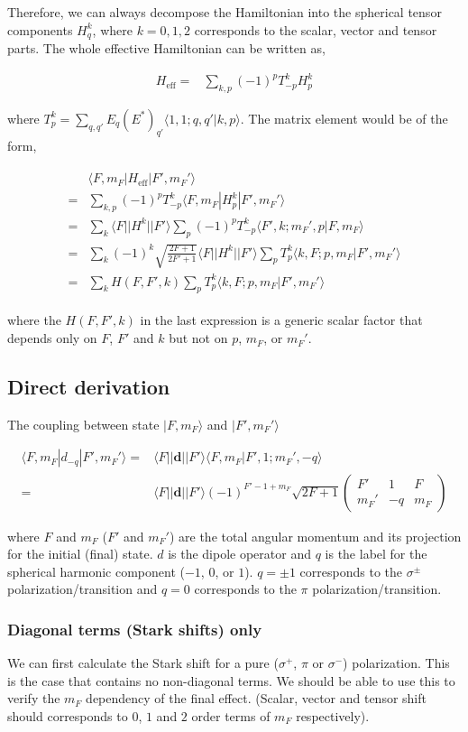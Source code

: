 \documentclass[10pt,fleqn]{article}
\newcommand{\dsum}{\displaystyle\sum}
\newcommand{\eqar}[1]
{
  \begin{align}
    #1
  \end{align}
}
\begin{document}
Therefore, we can always decompose the Hamiltonian into the spherical tensor components
$H^k_q$, where $k=0,1,2$ corresponds to the scalar, vector and tensor parts.
The whole effective Hamiltonian can be written as,
\eqar{
  H_{\mathrm{eff}}=&\sum_{k,p}(-1)^p T^k_{-p}H^k_p
}
where $T^k_p=\dsum_{q,q'}E_q(E^*)_{q'}\langle 1,1;q,q'|k,p\rangle$.
The matrix element would be of the form,
\eqar{
  \begin{split}
    &\langle F,m_F|H_{\mathrm{eff}}|F',m_F'\rangle\\
    =&\sum_{k,p}(-1)^p T^k_{-p}\langle F,m_F|H^k_p|F',m_F'\rangle\\
    =&\sum_{k}\langle F||H^k||F'\rangle\sum_{p}(-1)^p T^k_{-p}
       \langle F',k;m_F',p|F,m_F\rangle\\
    =&\sum_{k}(-1)^{k}\sqrt{\frac{2F+1}{2F'+1}}\langle F||H^k||F'\rangle
       \sum_{p}T^k_{p}\langle k,F;p,m_F|F',m_F'\rangle\\
    =&\sum_{k}H(F,F',k)\sum_{p}T^k_{p}\langle k,F;p,m_F|F',m_F'\rangle
  \end{split}
}
where the $H(F,F',k)$ in the last expression is a generic scalar factor
that depends only on $F$, $F'$ and $k$ but not on $p$, $m_F$, or $m_F'$.


\subsection{Direct derivation}
The coupling between state $|F,m_F\rangle$ and $|F',m_F'\rangle$
\eqar{
  \langle F,m_F|d_{-q}|F',m_F'\rangle=&\langle F||\mathbf{d}||F'\rangle\langle F,m_F|F',1;m_F',-q\rangle\\
  =&\langle F||\mathbf{d}||F'\rangle (-1)^{F'-1+m_F}\sqrt{2F+1}
  \begin{pmatrix}
    F'&1&F\\
    m_F'&-q&m_F
  \end{pmatrix}
}
where $F$ and $m_F$ ($F'$ and $m_F'$) are the total angular momentum and its projection
for the initial (final) state. $d$ is the dipole operator and $q$ is the label
for the spherical harmonic component ($-1$, $0$, or $1$).
$q=\pm1$ corresponds to the $\sigma^\pm$ polarization/transition
and $q=0$ corresponds to the $\pi$ polarization/transition.\\

\subsubsection{Diagonal terms (Stark shifts) only}\label{stark-shift-explicit}
We can first calculate the Stark shift for a pure
($\sigma^+$, $\pi$ or $\sigma^-$) polarization.
This is the case that contains no non-diagonal terms.
We should be able to use this to verify the $m_F$ dependency of the final effect.
(Scalar, vector and tensor shift should corresponds to $0$, $1$ and $2$ order terms
of $m_F$ respectively).\\
\end{document}
